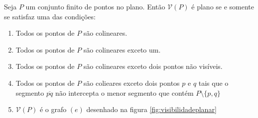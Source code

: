 \begin{lema}\label{visibilidadeplanar}
    Seja $P$ um conjunto finito de pontos no plano. Então $\mathcal V(P)$ é plano se e somente se satisfaz uma das condições:
    \begin{enumerate}[label=(\alph*)]
        \item
            Todos os pontos de $P$ são colineares.
        \item
            Todos os pontos de $P$ são colineares exceto um.
        \item
            Todos os pontos de $P$ são colineares exceto dois pontos não visíveis.
        \item
            Todos os pontos de $P$ são colieares exceto dois pontos $p$ e $q$ tais que o segmento $\overline{pq}$ não intercepta o menor segmento que contém $P\setminus\{p,q\}$
        \item
            $\mathcal V(P)$ é o grafo $(e)$ desenhado na figura \ref{fig:visibilidadeplanar}
    \end{enumerate}
\end{lema}
